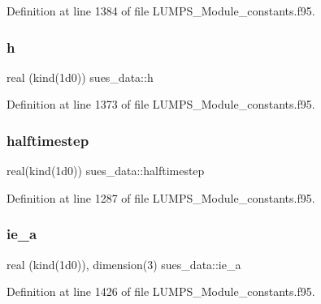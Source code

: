 Definition at line 1384 of file L\+U\+M\+P\+S\+\_\+\+Module\+\_\+constants.\+f95.

\mbox{\label{namespacesues__data_ae76235b1ac6a388886f63eb27a0905dd}} 
\subsubsection{\texorpdfstring{h}{h}}
{\footnotesize\ttfamily real (kind(1d0)) sues\+\_\+data\+::h}



Definition at line 1373 of file L\+U\+M\+P\+S\+\_\+\+Module\+\_\+constants.\+f95.

\mbox{\label{namespacesues__data_a6e2f669999914372fd2de922c917e6dc}} 
\subsubsection{\texorpdfstring{halftimestep}{halftimestep}}
{\footnotesize\ttfamily real(kind(1d0)) sues\+\_\+data\+::halftimestep}



Definition at line 1287 of file L\+U\+M\+P\+S\+\_\+\+Module\+\_\+constants.\+f95.

\mbox{\label{namespacesues__data_a1ddda58bf0af48716e6e89efefa42b47}} 
\subsubsection{\texorpdfstring{ie\+\_\+a}{ie\_a}}
{\footnotesize\ttfamily real (kind(1d0)), dimension(3) sues\+\_\+data\+::ie\+\_\+a}



Definition at line 1426 of file L\+U\+M\+P\+S\+\_\+\+Module\+\_\+constants.\+f95.

\mbox{\label{namespacesues__data_a7f97cb4ce39cccee777bae8977654da7}} 
